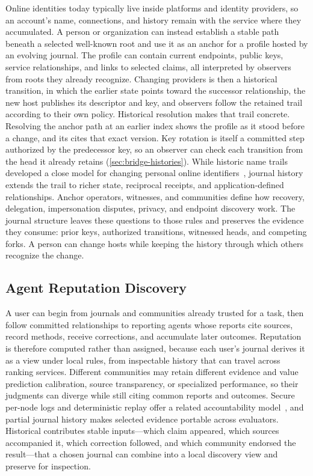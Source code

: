 Online identities today typically live inside platforms and identity providers, so an account's name, connections, and history remain with the service where they accumulated. A person or organization can instead establish a stable path beneath a selected well-known root and use it as an anchor for a profile hosted by an evolving journal. The profile can contain current endpoints, public keys, service relationships, and links to selected claims, all interpreted by observers from roots they already recognize. Changing providers is then a historical transition, in which the earlier state points toward the successor relationship, the new host publishes its descriptor and key, and observers follow the retained trail according to their own policy. Historical resolution makes that trail concrete. Resolving the anchor path at an earlier index shows the profile as it stood before a change, and its  cites that exact version. Key rotation is itself a committed step authorized by the predecessor key, so an observer can check each transition from the head it already retains (\cref{sec:bridge-histories}). While historic name trails developed a close model for changing personal online identifiers~\cite{Maniatis2003hints}, journal history extends the trail to richer state, reciprocal receipts, and application-defined relationships. Anchor operators, witnesses, and communities define how recovery, delegation, impersonation disputes, privacy, and endpoint discovery work. The journal structure leaves these questions to those rules and preserves the evidence they consume: prior keys, authorized transitions, witnessed heads, and competing forks. A person can change hosts while keeping the history through which others recognize the change.

\subsection{Agent Reputation Discovery}

A user can begin from journals and communities already trusted for a task, then follow committed relationships to reporting agents whose reports cite sources, record methods, receive corrections, and accumulate later outcomes. Reputation is therefore computed rather than assigned, because each user's journal derives it as a view under local rules, from inspectable history that can travel across ranking services. Different communities may retain different evidence and value prediction calibration, source transparency, or specialized performance, so their judgments can diverge while still citing common reports and outcomes. Secure per-node logs and deterministic replay offer a related accountability model~\cite{Haeberlen2007peerreview}, and partial journal history makes selected evidence portable across evaluators. Historical  contributes stable inputs---which claim appeared, which sources accompanied it, which correction followed, and which community endorsed the result---that a chosen journal can combine into a local discovery view and preserve for inspection.

